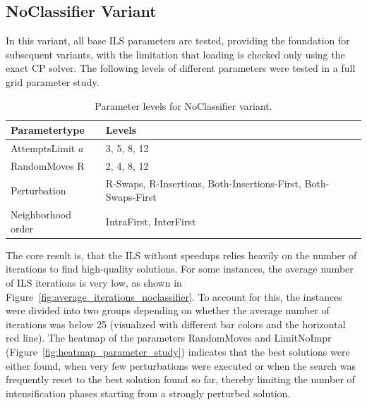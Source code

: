 \subsection{NoClassifier Variant}
\label{subsec_parameterStuy_noclassifier}
In this variant, all base \gls{ILS} parameters are tested, providing the foundation for subsequent variants,
with the limitation that loading is checked only using the exact \gls{CP} solver. The following levels of
different parameters were tested in a full grid parameter study.
\begin{table}[ht]
	\centering
	\small
	\setlength{\tabcolsep}{2em}
	\def\arraystretch{1.1}
	\begin{tabular}{@{}L{4cm}P{8cm}@{}}
		\toprule
		Parametertype      & Levels                                                         \\
		\midrule
		AttemptsLimit $a$  & 3, 5, 8, 12                                                    \\
		RandomMoves R      & 2, 4, 8, 12                                                    \\
		Perturbation       & R-Swaps, R-Insertions, Both-Insertions-First, Both-Swaps-First \\
		Neighborhood order & IntraFirst, InterFirst                                         \\
		\bottomrule
	\end{tabular}
	\caption{Parameter levels for NoClassifier variant.}
	\label{tab:parameters_noclassifier}
\end{table}
The core result is, that the \gls{ILS} without speedups relies heavily on the number of iterations to find high-quality solutions.
For some instances, the average number of ILS iterations is very low, as shown in Figure~\ref{fig:average_iterations_noclassifier}.
To account for this, the instances were divided into two groups depending on whether the average number of iterations was below 25
(visualized with different bar colors and the horizontal red line). The heatmap of the parameters RandomMoves and LimitNoImpr
(Figure~\ref{fig:heatmap_parameter_study}) indicates that the best solutions were either found, when very few perturbations were
executed or when the search was frequently reset to the best solution found so far, thereby limiting the number of intensification
phases starting from a strongly perturbed solution.
